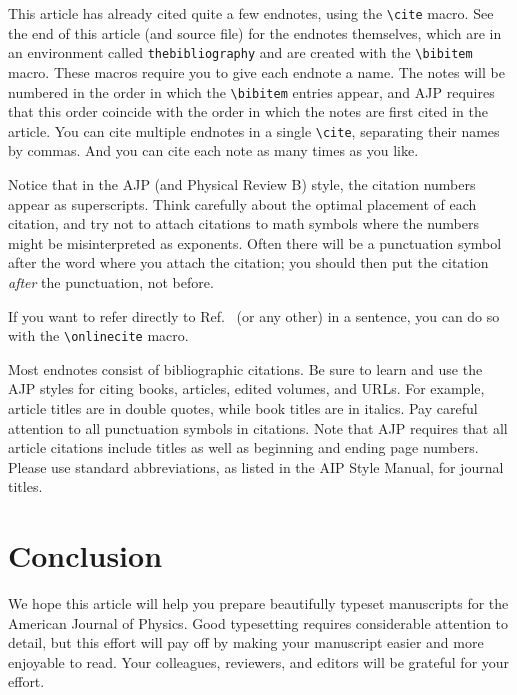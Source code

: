 \documentclass[prb,preprint]{revtex4-1}
\begin{document}
This article has already cited quite a few endnotes, using the \verb/\cite/
macro. See the end of this article (and source file) for the endnotes
themselves, which are in an environment called \texttt{thebibliography}
and are created with the \verb/\bibitem/ macro.  These macros require
you to give each endnote a name.  The notes will be numbered in the
order in which the \verb/\bibitem/ entries appear, and AJP requires that
this order coincide with the order in which the notes are first cited in 
the article.  You can cite multiple endnotes in a single \verb/\cite/, 
separating their names by commas.  And you can cite each note as many 
times as you like.

Notice that in the AJP (and Physical Review B) style, the citation numbers 
appear as superscripts. Think carefully about the optimal placement of
each citation, and try not to attach citations to math symbols where the
numbers might be misinterpreted as exponents. Often there will be a
punctuation symbol after the word where you attach the citation; you
should then put the citation \textit{after} the punctuation, not 
before.\cite{nevermindlogic}

If you want to refer directly to Ref.~ (or any other) 
in a sentence, you can do so with the \verb/\onlinecite/ macro.

Most endnotes consist of bibliographic citations.\cite{noBIBTeX}  Be sure 
to learn and use the AJP styles for citing books,\cite{latexbook} 
articles,\cite{dyson} edited volumes,\cite{examplevolume} and
URLs.\cite{latexsite}  For example, article titles are in double quotes, 
while book titles are in italics. Pay careful attention to all punctuation 
symbols in citations.  Note that AJP requires that all article citations 
include titles as well as beginning and ending page numbers.
Please use standard abbreviations, as listed in the AIP Style 
Manual,\cite{AIPstylemanual} for journal titles.


\section{Conclusion}

We hope this article will help you prepare beautifully typeset
manuscripts for the American Journal of Physics.  Good typesetting requires
considerable attention to detail, but this effort will pay off by making your
manuscript easier and more enjoyable to read.  Your colleagues, reviewers, 
and editors will be grateful for your effort.
\end{document}
